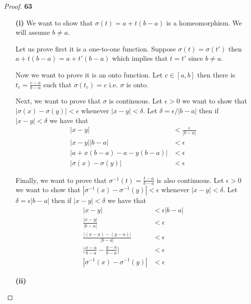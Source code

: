 \documentclass[11pt]{article}
\theoremstyle{definition}
\begin{document}
    \begin{proof}{\textbf{63}}
        \begin{itemize}
            \item [\textbf{(i)}]
            We want to show that $\sigma(t) = a + t(b-a)$ is a homeomorphism.
            We will assume $b \neq a$.
            
            Let us prove first it is a one-to-one function. Suppose
            $\sigma(t) =\sigma(t')$ then $a + t(b-a) = a + t'(b-a)$ which
            implies that $t = t'$ since $b \neq a$.
            
            Now we want to prove it is an onto function. Let
            $c \in [a,b]$ then there is $t_c = \frac{c - a}{b-a}$ such that
            $\sigma(t_c) = c$ i.e. $\sigma$ is onto.

            Next, we want to prove that $\sigma$ is continuous. Let
            $\epsilon > 0$ we want to show that
            $|\sigma(x) - \sigma(y)| < \epsilon$ whenever $|x-y| < \delta$.
            Let $\delta = \epsilon/|b-a|$ then if $|x-y| < \delta$ we have
            that
            \begin{align*}
                |x-y| &< \frac{\epsilon}{|b-a|}\\
                |x-y||b-a| &< \epsilon\\
                |a + x(b-a) -a - y(b-a)| &< \epsilon\\
                |\sigma(x) - \sigma(y)| &< \epsilon
            \end{align*}

            Finally, we want to prove that
            $\sigma^{-1}(t) = \frac{t -a}{b-a}$ is also continuous. Let
            $\epsilon > 0$ we want to show that
            $|\sigma^{-1}(x) - \sigma^{-1}(y)| < \epsilon$ whenever
            $|x-y| < \delta$. Let $\delta = \epsilon |b-a|$ then if
            $|x-y| < \delta$ we have that
            \begin{align*}
                |x-y| &< \epsilon|b-a|\\
                \frac{|x-y|}{|b-a|} &< \epsilon\\
                \frac{|(x - a) - (y - a)|}{|b-a|} &< \epsilon\\
                \bigg|\frac{x-a}{b-a} - \frac{y-a}{b-a}\bigg| &< \epsilon\\
                |\sigma^{-1}(x) - \sigma^{-1}(y)| &< \epsilon
            \end{align*}

            \item [\textbf{(ii)}]
            

\end{itemize}
\end{proof}
\end{document}
